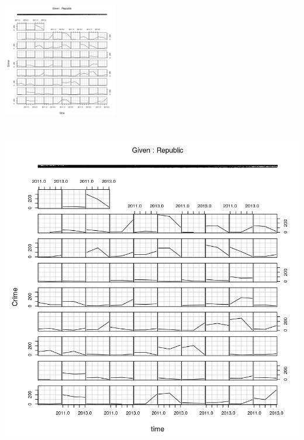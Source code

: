 \documentclass[a4paper,12pt]{article}
\begin{document}
\includegraphics[scale = 0.3,width = 5cm, height = 7cm, keepaspectratio]{risunok} %
\includegraphics[scale = 0.3, draft]{risunok} %
\end{document}
